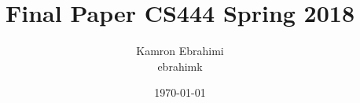 \documentclass[10pt,onecolumn,draftclsnofoot]{IEEEtran} %
\title{Final Paper CS444 Spring 2018}
\author{Kamron Ebrahimi\\ ebrahimk}
\date{\today}
\begin{document}
\begin{titlingpage}
\maketitle
\end{titlingpage}


\tableofcontents
\newpage







\newpage
\begin{singlespace}

\newpage



\end{singlespace}

\restoregeometry
\end{document}
